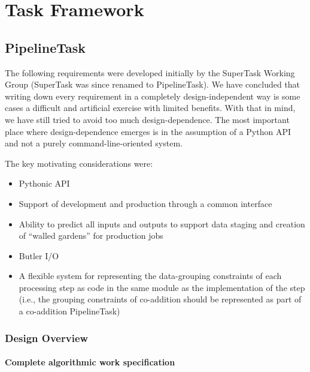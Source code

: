 \documentclass[SE,toc,lsstdraft]{lsstdoc}
\begin{document}
\section{Task Framework}

\subsection{PipelineTask}

The following requirements were developed initially by the SuperTask Working Group (SuperTask was since renamed to PipelineTask). We have concluded that writing down every requirement in a completely design-independent way is some cases a difficult and artificial exercise with limited benefits. With that in mind, we have still tried to avoid too much design-dependence. The most important place where design-dependence emerges is in the assumption of a Python API and not a purely command-line-oriented system.

The key motivating considerations were:

    \begin{itemize}
\item
Pythonic API

\item
Support of development and production through a common interface

\item
Ability to predict all inputs and outputs to support data staging and creation of “walled gardens” for production jobs

\item
Butler I/O

\item
A flexible system for representing the data-grouping constraints of each processing step as code in the same module as the implementation of the step (i.e., the grouping constraints of co-addition should be represented as part of a co-addition PipelineTask)

    \end{itemize}

\subsubsection{Design Overview}

\paragraph{Complete algorithmic work specification}\hfill  %
\end{document}
